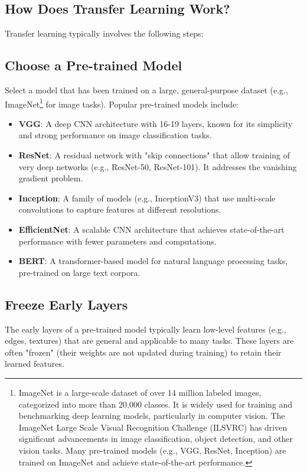 \begin{notechapter}
\section{How Does Transfer Learning Work?}
Transfer learning typically involves the following steps:

\subsection{Choose a Pre-trained Model}
Select a model that has been trained on a large, general-purpose
dataset (e.g., ImageNet\footnote{ImageNet is a large-scale dataset of over 14 million labeled images, categorized into more than 20,000 classes. It is widely used for training and benchmarking deep learning models, particularly in computer vision. The ImageNet Large Scale Visual Recognition Challenge (ILSVRC) has driven significant advancements in image classification, object detection, and other vision tasks. Many pre-trained models (e.g., VGG, ResNet, Inception) are trained on ImageNet and achieve state-of-the-art performance.} for image tasks). Popular pre-trained models
include:
\begin{itemize}
    \item \textbf{VGG}: A deep CNN architecture with 16-19 layers,
          known for its simplicity and strong performance on image
          classification tasks.
    \item \textbf{ResNet}: A residual network with "skip connections"
          that allow training of very deep networks (e.g., ResNet-50,
          ResNet-101). It addresses the vanishing gradient problem.
    \item \textbf{Inception}: A family of models (e.g., InceptionV3)
          that use multi-scale convolutions to capture features at
          different resolutions.
    \item \textbf{EfficientNet}: A scalable CNN architecture that
          achieves state-of-the-art performance with fewer parameters
          and computations.
    \item \textbf{BERT}: A transformer-based model for natural language
          processing tasks, pre-trained on large text corpora.
\end{itemize}

\subsection{Freeze Early Layers}
The early layers of a pre-trained model typically learn low-level
features (e.g., edges, textures) that are general and applicable to
many tasks. These layers are often "frozen" (their weights are not
updated during training) to retain their learned features.


\end{notechapter}

